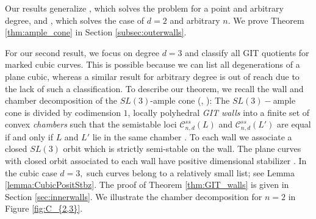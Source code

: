 \documentclass{amsart}
\newcommand{\mc}{\mathcal}
\numberwithin{equation}{section}
\theoremstyle{definition}
\begin{document}
  

Our results generalize \cite[Proposition 4.2]{Jen13}, which solves the problem for a point and arbitrary degree, and \cite[Theorem 1.1]{Giansiracusa_2010}, which solves the case of $d=2$ and arbitrary $n$.
We prove Theorem \ref{thm:ample_cone} in Section \ref{subsec:outerwalls}.



For our second result, we focus on degree $d=3$ and classify all GIT quotients for marked cubic curves. This is possible because we can list all degenerations of a plane cubic, whereas a similar result for arbitrary degree is out of reach due to the lack of such a classification. 
To describe our theorem,  we recall the wall and chamber decomposition of the $SL(3)$-ample cone (\cite{DH98}, \cite{Tha96}): The $SL(3)-$ample cone is divided  by codimension $1$, locally polyhedral \textit{GIT walls} into a finite set of convex \textit{chambers} such that the semistable loci $\mc{C}_{n,d}^{ss}(L)$ and $\mc{C}_{n,d}^{ss}(L')$ are equal if and only if $L$ and $L'$ lie in the same chamber \cite[Theorem 2.3]{Tha96}. To each wall we associate a closed $SL(3)$ orbit which is strictly semi-stable on the wall. The plane curves with closed orbit associated to each wall have positive dimensional stabilizer \cite[Definition 3.3.1]{DH98}. In the cubic case $d=3,$ such curves belong to a relatively small list; see Lemma \ref{lemma:CubicPositStbz}. 
The proof of Theorem \ref{thm:GIT_walls} is given in Section \ref{sec:innerwalls}. We illustrate the chamber decomposition for $n=2$ in Figure \ref{fig:C_{2,3}}.
\end{document}

